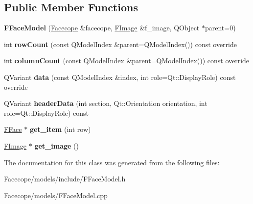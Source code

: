 \subsection*{Public Member Functions}
\begin{DoxyCompactItemize}
\item 
\mbox{\label{classFFaceModel_a78b485cf9ab083b02b589216738ec1c1}} 
{\bfseries F\+Face\+Model} (\hyperlink{structFacecope}{Facecope} \&facecope, \hyperlink{classFImage}{F\+Image} \&f\+\_\+image, Q\+Object $\ast$parent=0)
\item 
\mbox{\label{classFFaceModel_af3cd862738b4abe440dd7cd740931982}} 
int {\bfseries row\+Count} (const Q\+Model\+Index \&parent=Q\+Model\+Index()) const override
\item 
\mbox{\label{classFFaceModel_a1efe53f446828417b8f7c39030e9a4ac}} 
int {\bfseries column\+Count} (const Q\+Model\+Index \&parent=Q\+Model\+Index()) const override
\item 
\mbox{\label{classFFaceModel_a7cee177081f026c5e01cd164859c5275}} 
Q\+Variant {\bfseries data} (const Q\+Model\+Index \&index, int role=Qt\+::\+Display\+Role) const override
\item 
\mbox{\label{classFFaceModel_a328af9e0b4af2a6187bff82de4ab2bd7}} 
Q\+Variant {\bfseries header\+Data} (int section, Qt\+::\+Orientation orientation, int role=Qt\+::\+Display\+Role) const
\item 
\mbox{\label{classFFaceModel_a2ac11aefcdfdbf400d945ce9d99e0893}} 
\hyperlink{classFFace}{F\+Face} $\ast$ {\bfseries get\+\_\+item} (int row)
\item 
\mbox{\label{classFFaceModel_ae494a0f8028db819b579aea2ce0c1074}} 
\hyperlink{classFImage}{F\+Image} $\ast$ {\bfseries get\+\_\+image} ()
\end{DoxyCompactItemize}


The documentation for this class was generated from the following files\+:\begin{DoxyCompactItemize}
\item 
Facecope/models/include/F\+Face\+Model.\+h\item 
Facecope/models/F\+Face\+Model.\+cpp\end{DoxyCompactItemize}
